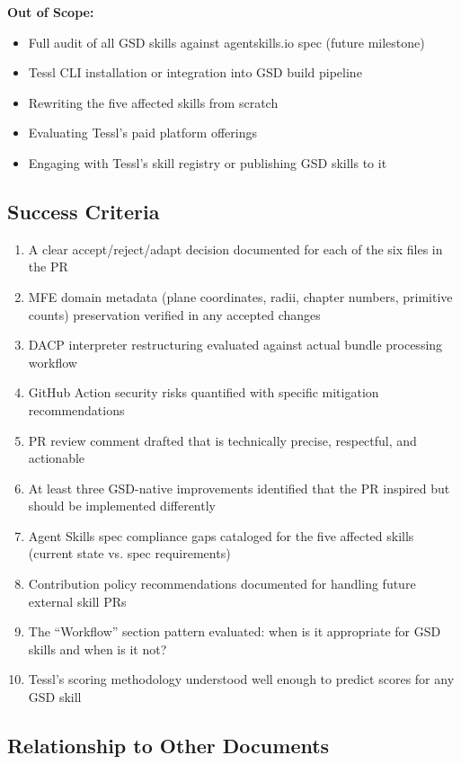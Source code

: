 \documentclass[11pt,letterpaper]{article}
\begin{document}
\textbf{Out of Scope:}
\begin{itemize}[leftmargin=2em]
\item Full audit of all GSD skills against agentskills.io spec (future milestone)
\item Tessl CLI installation or integration into GSD build pipeline
\item Rewriting the five affected skills from scratch
\item Evaluating Tessl's paid platform offerings
\item Engaging with Tessl's skill registry or publishing GSD skills to it
\end{itemize}

\subsection{Success Criteria}

\begin{enumerate}[leftmargin=2em]
\item A clear accept/reject/adapt decision documented for each of the six files in the PR
\item MFE domain metadata (plane coordinates, radii, chapter numbers, primitive counts) preservation verified in any accepted changes
\item DACP interpreter restructuring evaluated against actual bundle processing workflow
\item GitHub Action security risks quantified with specific mitigation recommendations
\item PR review comment drafted that is technically precise, respectful, and actionable
\item At least three GSD-native improvements identified that the PR inspired but should be implemented differently
\item Agent Skills spec compliance gaps cataloged for the five affected skills (current state vs. spec requirements)
\item Contribution policy recommendations documented for handling future external skill PRs
\item The ``Workflow'' section pattern evaluated: when is it appropriate for GSD skills and when is it not?
\item Tessl's scoring methodology understood well enough to predict scores for any GSD skill
\end{enumerate}

\subsection{Relationship to Other Documents}
\end{document}
